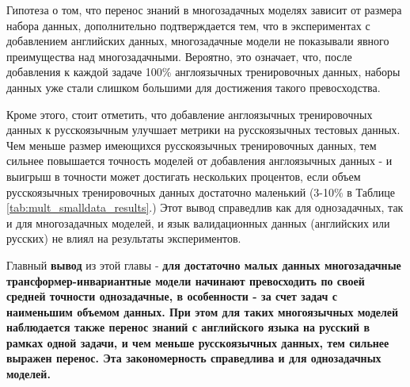 
Гипотеза о том, что перенос знаний в многозадачных моделях зависит от размера набора данных, дополнительно подтверждается тем, что в экспериментах с добавлением английских данных, многозадачные модели не показывали явного преимущества над многозадачными. Вероятно, это означает, что, после добавления к каждой задаче 100\% англоязычных тренировочных данных, наборы данных уже стали слишком большими для достижения такого превосходства.

Кроме этого, стоит отметить, что добавление англоязычных тренировочных данных к русскоязычным улучшает метрики на русскоязычных тестовых данных. Чем меньше размер имеющихся русскоязычных тренировочных данных, тем сильнее повышается точность моделей от добавления англоязычных данных - и выигрыш в точности может достигать нескольких процентов, если объем русскоязычных тренировочных данных достаточно маленький (3-10\% в Таблице \ref{tab:mult_smalldata_results}.) Этот вывод справедлив как для однозадачных, так и для многозадачных моделей, и язык валидационных данных (английских или русских) не влиял на результаты экспериментов.

Главный \textbf{вывод} из этой главы - \textbf{для достаточно малых данных многозадачные трансформер-инвариантные модели начинают превосходить по своей средней точности однозадачные, в особенности - за счет задач с наименьшим объемом данных. При этом для таких многоязычных моделей наблюдается также перенос знаний с английского языка на русский в рамках одной задачи, и чем меньше русскоязычных данных, тем сильнее выражен перенос. Эта закономерность справедлива и для однозадачных моделей.}
